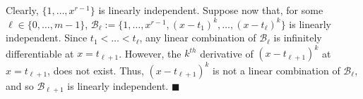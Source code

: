 \documentclass[11pt]{article}
\renewcommand{\qed}{\quad \ensuremath{\blacksquare}}
\newcommand{\B}{\mathcal{B}}
\begin{document}
\begin{enumerate}
\begin{enumerate}
Clearly, $\{1,\dots,x^{r - 1}\}$ is linearly independent. Suppose now that, for
some $\ell \in \{0,\dots,m - 1\}$,
$\B_\ell := \{1,\dots,x^{r - 1},(x - t_1)^k,\dots,(x - t_\ell)^k\}$ is linearly
independent. Since $t_1 < \dots < t_\ell$, any linear combination of $\B_\ell$
is infinitely differentiable at $x = t_{\ell + 1}$. However, the $k^{th}$
derivative of $(x - t_{\ell + 1})^k$ at $x = t_{\ell + 1}$, does not exist.
Thus, $(x - t_{\ell + 1})^k$ is not a linear combination of $\B_\ell$, and so
$\B_{\ell + 1}$ is linearly independent. \qed
\end{enumerate}
\end{enumerate}
\end{document}
